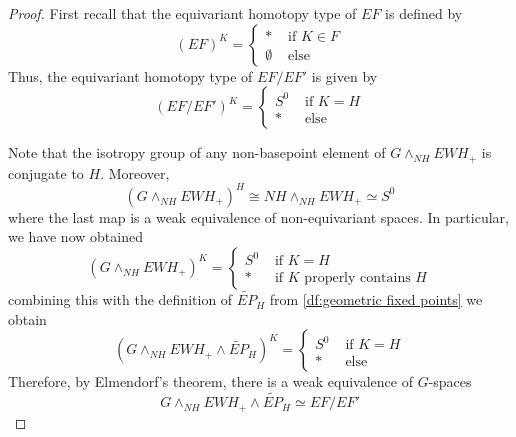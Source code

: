 \documentclass[10pt,a4paper]{amsart}
\begin{document}
\begin{proof}
First recall that the equivariant homotopy type of $EF$ is defined by 
\[
(EF)^K = \begin{cases}
* & \text{ if } K\in F\\
\emptyset & \text{ else }
\end{cases}
\]
Thus, the equivariant homotopy type of $EF/EF'$ is given by 
\[
(EF/EF')^K = \begin{cases}
S^0 & \text{ if } K = H\\
* & \text{ else }
\end{cases} 
\]

Note that the isotropy group of any non-basepoint element of $G\wedge_{NH}EWH_+$ is conjugate to $H$. Moreover, 
\[
(G\wedge_{NH}EWH_+)^H \cong NH\wedge_{NH}EWH_+ \simeq S^0
\]
where the last map is a weak equivalence of non-equivariant spaces. In particular, we have now obtained
\[
(G\wedge_{NH}EWH_+)^K = \begin{cases}
S^0 & \text{ if } K=H\\
* & \text{ if $K$ properly contains $H$}
\end{cases}
\]
combining this with the definition of $\widetilde{EP}_H$ from \cref{df:geometric fixed points} we obtain
\[
(G\wedge_{NH}EWH_+ \wedge\widetilde{EP}_H)^K = \begin{cases}
S^0 & \text{ if } K = H\\
* & \text{ else }
\end{cases}
\]
Therefore, by Elmendorf's theorem, there is a weak equivalence of $G$-spaces
\[
G\wedge_{NH}EWH_+ \wedge\widetilde{EP}_H \simeq EF/EF'
\]
\end{proof}
\end{document}
